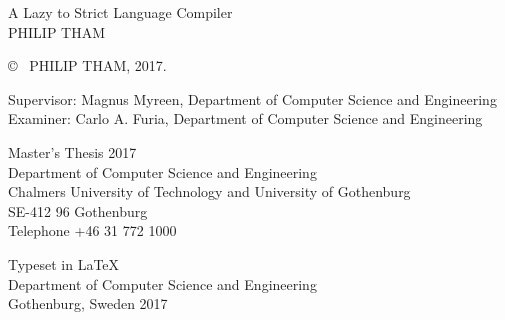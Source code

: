 \thispagestyle{plain}
\vspace*{4.5cm}
\noindent
A Lazy to Strict Language Compiler\\
PHILIP THAM \setlength{\parskip}{1cm}

\noindent
\copyright ~ PHILIP THAM, 2017.
\setlength{\parskip}{1cm}

\noindent
Supervisor: Magnus Myreen, Department of Computer Science and Engineering\\
Examiner: Carlo A. Furia, Department of Computer Science and Engineering
\setlength{\parskip}{1cm}

\noindent
Master's Thesis 2017\\	%
Department of Computer Science and Engineering\\
Chalmers University of Technology and University of Gothenburg\\
SE-412 96 Gothenburg\\
Telephone +46 31 772 1000
\setlength{\parskip}{0.5cm}

\vfill

\noindent
Typeset in \LaTeX \\
Department of Computer Science and Engineering\\
Gothenburg, Sweden 2017

